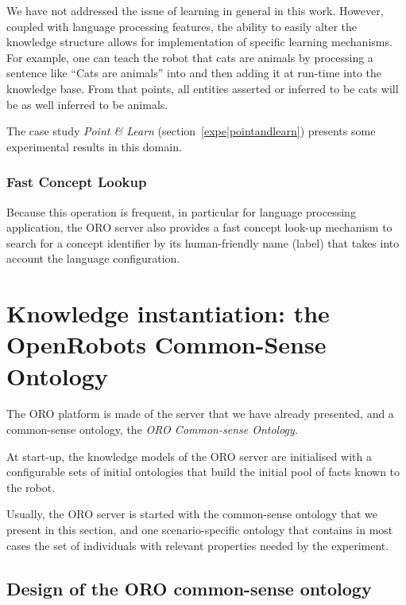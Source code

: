 We have not addressed the issue of learning in general in this work. However,
coupled with language processing features, the ability to easily alter the
knowledge structure allows for implementation of specific learning mechanisms.
For example, one can teach the robot that cats are animals by processing a
sentence like ``Cats are animals'' into  and then
adding it at run-time into the knowledge base. From that points, all entities
asserted or inferred to be cats will be as well inferred to be animals.

The case study \emph{Point \& Learn} (section~\ref{expe|pointandlearn})
presents some experimental results in this domain.

\subsubsection{Fast Concept Lookup}
\label{sect|oroserver-lookup}

Because this operation is frequent, in particular for language processing
application, the ORO server also provides a fast concept look-up mechanism to
search for a concept identifier by its human-friendly name (label) that takes
into account the language configuration.


\section{Knowledge instantiation: the OpenRobots Common-Sense Ontology}

The ORO platform is made of the server that we have already presented, and a
common-sense ontology, the \emph{ORO Common-sense Ontology}.

At start-up, the knowledge models of the ORO server are initialised with a
configurable sets of initial ontologies that build the initial pool of facts
known to the robot.

Usually, the ORO server is started with the common-sense ontology that we
present in this section, and one scenario-specific ontology that contains in
most cases the set of individuals with relevant properties needed by the
experiment.

\subsection{Design of the ORO common-sense ontology}
\label{sect|commonsense-design}


